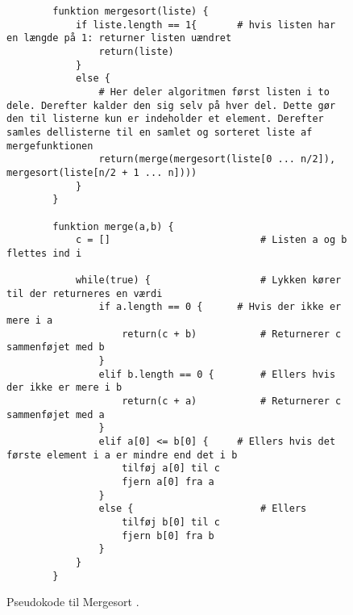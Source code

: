 \begin{figure}[h]
\begin{center}
	\begin{lstlisting}
		funktion mergesort(liste) {
			if liste.length == 1{ 		# hvis listen har en længde på 1: returner listen uændret
				return(liste)
			}
			else {
				# Her deler algoritmen først listen i to dele. Derefter kalder den sig selv på hver del. Dette gør den til listerne kun er indeholder et element. Derefter samles dellisterne til en samlet og sorteret liste af mergefunktionen
				return(merge(mergesort(liste[0 ... n/2]), mergesort(liste[n/2 + 1 ... n])))
			}
		}

		funktion merge(a,b) {
			c = []							# Listen a og b flettes ind i

			while(true) {					# Lykken kører til der returneres en værdi 
				if a.length == 0 {		# Hvis der ikke er mere i a
					return(c + b)			# Returnerer c sammenføjet med b
				}
				elif b.length == 0 {		# Ellers hvis der ikke er mere i b
					return(c + a)			# Returnerer c sammenføjet med a
				}
				elif a[0] <= b[0] {		# Ellers hvis det første element i a er mindre end det i b
					tilføj a[0] til c
					fjern a[0] fra a
				}
				else {						# Ellers
					tilføj b[0] til c
					fjern b[0] fra b
				}
			}
		}

	\end{lstlisting}
\end{center}
\vspace{-5mm}
\caption{Pseudokode til Mergesort \cite[s. 106]{aogd}.}
\label{fig:Pseudokode til mergesort}
\end{figure}



